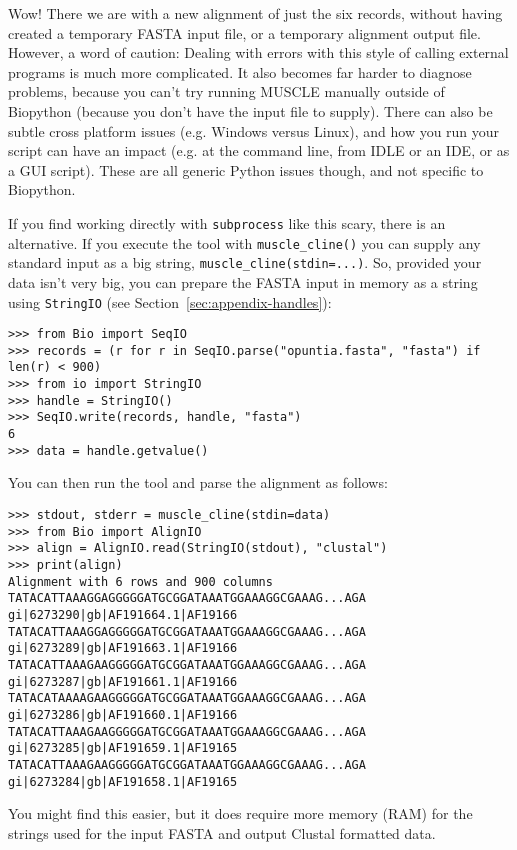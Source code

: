 Wow! There we are with a new alignment of just the six records, without having created
a temporary FASTA input file, or a temporary alignment output file. However, a word of
caution: Dealing with errors with this style of calling external programs is much more
complicated.
It also becomes far harder to diagnose problems, because you can't try running MUSCLE
manually outside of Biopython (because you don't have the input file to supply).
There can also be subtle cross platform issues (e.g. Windows versus Linux), and how
you run your script can have an impact (e.g. at the command line, from IDLE or an
IDE, or as a GUI script). These are all generic Python issues though, and not
specific to Biopython.

If you find working directly with \texttt{subprocess} like this scary, there is an
alternative. If you execute the tool with \texttt{muscle\_cline()} you can supply
any standard input as a big string, \texttt{muscle\_cline(stdin=...)}. So,
provided your data isn't very big, you can prepare the FASTA input in memory as
a string using \texttt{StringIO} (see Section~\ref{sec:appendix-handles}):

\begin{verbatim}
>>> from Bio import SeqIO
>>> records = (r for r in SeqIO.parse("opuntia.fasta", "fasta") if len(r) < 900)
>>> from io import StringIO
>>> handle = StringIO()
>>> SeqIO.write(records, handle, "fasta")
6
>>> data = handle.getvalue()
\end{verbatim}

\noindent You can then run the tool and parse the alignment as follows:

\begin{verbatim}
>>> stdout, stderr = muscle_cline(stdin=data)
>>> from Bio import AlignIO
>>> align = AlignIO.read(StringIO(stdout), "clustal")
>>> print(align)
Alignment with 6 rows and 900 columns
TATACATTAAAGGAGGGGGATGCGGATAAATGGAAAGGCGAAAG...AGA gi|6273290|gb|AF191664.1|AF19166
TATACATTAAAGGAGGGGGATGCGGATAAATGGAAAGGCGAAAG...AGA gi|6273289|gb|AF191663.1|AF19166
TATACATTAAAGAAGGGGGATGCGGATAAATGGAAAGGCGAAAG...AGA gi|6273287|gb|AF191661.1|AF19166
TATACATAAAAGAAGGGGGATGCGGATAAATGGAAAGGCGAAAG...AGA gi|6273286|gb|AF191660.1|AF19166
TATACATTAAAGAAGGGGGATGCGGATAAATGGAAAGGCGAAAG...AGA gi|6273285|gb|AF191659.1|AF19165
TATACATTAAAGAAGGGGGATGCGGATAAATGGAAAGGCGAAAG...AGA gi|6273284|gb|AF191658.1|AF19165
\end{verbatim}

You might find this easier, but it does require more memory (RAM) for the strings
used for the input FASTA and output Clustal formatted data.


